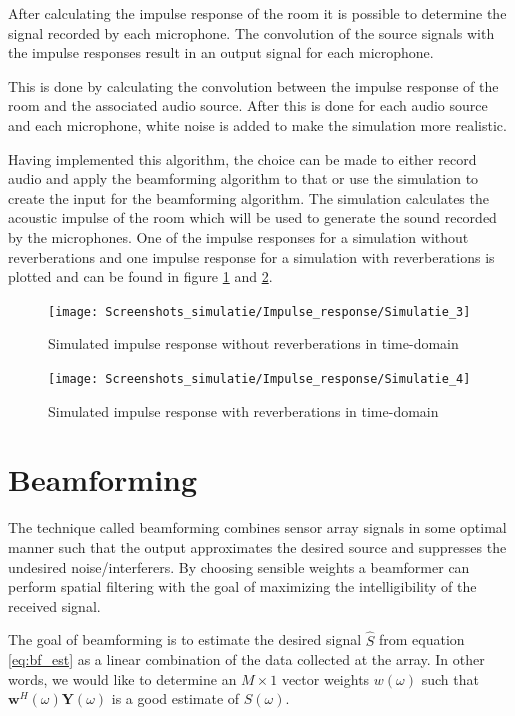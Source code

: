 After calculating the impulse response of the room it is possible to determine the signal recorded by each microphone. The convolution of the source signals with the impulse responses result in an output signal for each microphone.

This is done by calculating the convolution between the impulse response of the room and the associated audio source. After this is done for each audio source and each microphone, white noise is added to make the simulation more realistic.

Having implemented this algorithm, the choice can be made to either record audio and apply the beamforming algorithm to that or use the simulation to create the input for the beamforming algorithm. The simulation calculates the acoustic impulse of the room which will be used to generate the sound recorded by the microphones. One of the impulse responses for a simulation without reverberations and one impulse response for a simulation with reverberations is plotted and can be found in figure \ref{fig:imp} and \ref{fig:impRev}.


\begin{figure}
	\centering  
	\texttt{[image: Screenshots\_simulatie/Impulse\_response/Simulatie\_3]}
	\caption[Simulated Impulse response without reverberations]{Simulated impulse response without reverberations in time-domain} 
	\label{fig:imp}
\end{figure}

\begin{figure} [h!]
	\centering  
	\texttt{[image: Screenshots\_simulatie/Impulse\_response/Simulatie\_4]}
	\caption[Simulated Impulse response with reverberations]{Simulated impulse response with reverberations in time-domain} 
	\label{fig:impRev}
\end{figure}

\section{Beamforming}
\label{sec:des_beamforming}
The technique called beamforming combines sensor array signals in some optimal manner such that the output approximates the desired source and suppresses the undesired noise/interferers. By choosing sensible weights a beamformer can perform spatial filtering with the goal of maximizing the intelligibility of the received signal.

The goal of beamforming is to estimate the desired signal $\hat{S}$ from equation \ref{eq:bf_est} as a linear combination of the data collected at the array. In other words, we would like to determine an $M \times 1$ vector weights $w(\omega)$ such that $\textbf{w}^{H}(\omega)\textbf{Y}(\omega)$ is a good estimate of $S(\omega)$.

